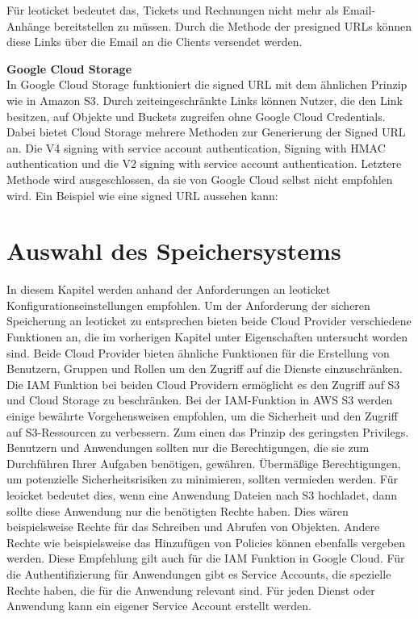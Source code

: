 Für leoticket bedeutet das, Tickets und Rechnungen nicht mehr als Email-Anhänge bereitstellen zu müssen. Durch die Methode der presigned URLs können diese Links über die Email an die Clients versendet werden.\\

\newpage

\textbf{Google Cloud Storage}\\

In Google Cloud Storage funktioniert die signed URL mit dem ähnlichen Prinzip wie in Amazon S3. Durch zeiteingeschränkte Links können Nutzer, die den Link besitzen, auf Objekte und Buckets zugreifen ohne Google Cloud Credentials. Dabei bietet Cloud Storage mehrere Methoden zur Generierung der Signed URL an. Die V4 signing with service account authentication, Signing with HMAC authentication und die V2 signing with service account authentication. Letztere Methode wird ausgeschlossen, da sie von Google Cloud selbst nicht empfohlen wird. Ein Beispiel wie eine signed URL aussehen kann:

\newpage

\section{Auswahl des Speichersystems}

In diesem Kapitel werden anhand der Anforderungen an leoticket Konfigurationseinstellungen empfohlen. Um der Anforderung der sicheren Speicherung an leoticket zu entsprechen bieten beide Cloud Provider verschiedene Funktionen an, die im vorherigen Kapitel unter Eigenschaften untersucht worden sind. Beide Cloud Provider bieten ähnliche Funktionen für die Erstellung von Benutzern, Gruppen und Rollen um den Zugriff auf die Dienste einzuschränken. Die IAM Funktion bei beiden Cloud Providern ermöglicht es den Zugriff auf S3 und Cloud Storage zu beschränken. Bei der IAM-Funktion in AWS S3 werden einige bewährte Vorgehensweisen empfohlen, um die Sicherheit und den Zugriff auf S3-Ressourcen zu verbessern. Zum einen das Prinzip des geringsten Privilegs. Benutzern und Anwendungen sollten nur die Berechtigungen, die sie zum Durchführen Ihrer Aufgaben benötigen, gewähren. Übermäßige Berechtigungen, um potenzielle Sicherheitsrisiken zu minimieren, sollten vermieden werden. Für leoicket bedeutet dies, wenn eine Anwendung Dateien nach S3 hochladet, dann sollte diese Anwendung nur die benötigten Rechte haben. Dies wären beispielsweise Rechte für das Schreiben und Abrufen von Objekten. Andere Rechte wie beispielsweise das Hinzufügen von Policies können ebenfalls vergeben werden. Diese Empfehlung gilt auch für die IAM Funktion in Google Cloud. Für die Authentifizierung für Anwendungen gibt es Service Accounts, die spezielle Rechte haben, die für die Anwendung relevant sind. Für jeden Dienst oder Anwendung kann ein eigener Service Account erstellt werden.\\

